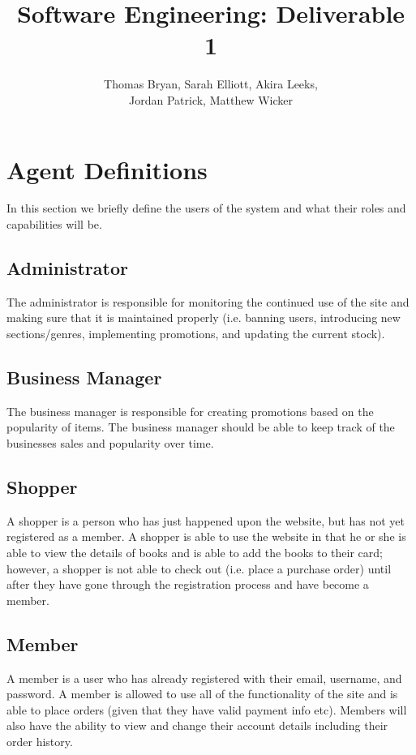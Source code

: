 \documentclass{article}
\title{Software Engineering: Deliverable 1}
\author{Thomas Bryan, Sarah Elliott,  Akira Leeks, \\ Jordan Patrick, Matthew Wicker  }
\begin{document}
\maketitle

\section {Agent Definitions}
In this section we briefly define the users of the system and what their roles and capabilities will be. 

\subsection{Administrator}
The administrator is responsible for monitoring the continued use of the site and making sure that it is maintained properly (i.e. banning users, introducing new sections/genres, implementing promotions, and updating the current stock).

\subsection{Business Manager}
The business manager is responsible for creating promotions based on the popularity of items. The business manager should be able to keep track of the businesses sales and popularity over time. 

\subsection{Shopper}
A shopper is a person who has just happened upon the website, but has not yet registered as a member. A shopper is able to use the website in that he or she is able to view the details of books and is able to add the books to their card; however, a shopper is not able to check out (i.e. place a purchase order) until after they have gone through the registration process and have become a member. 

\subsection{Member}
A member is a user who has already registered with their email, username, and password. A member is allowed to use all of the functionality of the site and is able to place orders (given that they have valid payment info etc). Members will also have the ability to view and change their account details including their order history. 
\end{document}
